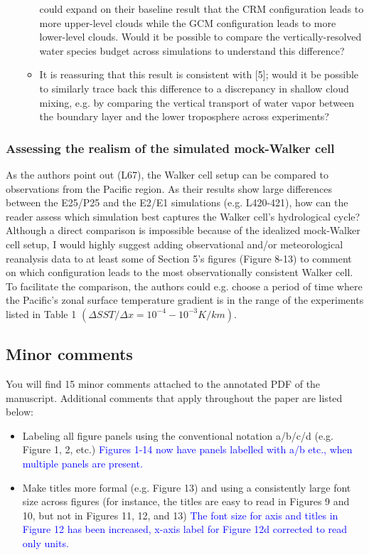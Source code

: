 \documentclass[draft]{agujournal2019}
\begin{document}
\begin{enumerate}
\begin{itemize}
could expand on their baseline result that the CRM configuration leads to more upper-level clouds while the GCM
configuration leads to more lower-level clouds. Would it be possible to compare the vertically-resolved water species
budget across simulations to understand this difference?
      \item It is reassuring that this result is consistent with [5]; would it be possible to similarly trace back this difference to a
discrepancy in shallow cloud mixing, e.g. by comparing the vertical transport of water vapor between the boundary
layer and the lower troposphere across experiments?
    \end{itemize}
\end{enumerate}

\subsubsection{Assessing the realism of the simulated mock-Walker cell}

As the authors point out (L67), the Walker cell setup can be compared to observations from the Pacific region. As their
results show large differences between the E25/P25 and the E2/E1 simulations (e.g. L420-421), how can the reader
assess which simulation best captures the Walker cell’s hydrological cycle?
Although a direct comparison is impossible because of the idealized mock-Walker cell setup, I would highly suggest
adding observational and/or meteorological reanalysis data to at least some of Section 5’s figures (Figure 8-13) to comment
on which configuration leads to the most observationally consistent Walker cell. To facilitate the comparison, the authors
could e.g. choose a period of time where the Pacific’s zonal surface temperature gradient is in the range of the experiments
listed in Table 1 $(\Delta SST/ \Delta x = 10^{-4} - 10^{-3} K/km).  $

\subsection{Minor comments}

You will find 15 minor comments attached to the annotated PDF of the manuscript. Additional comments that apply
throughout the paper are listed below:
\begin{itemize}
  \item Labeling all figure panels using the conventional notation a/b/c/d (e.g. Figure 1, 2, etc.)
  \textcolor{blue}{Figures 1-14 now have panels labelled with a/b etc., when multiple panels are present.}
  
  \item Make titles more formal (e.g. Figure 13) and using a consistently large font size across figures (for instance, the
titles are easy to read in Figures 9 and 10, but not in Figures 11, 12, and 13)
  \textcolor{blue}{The font size for axis and titles in Figure 12 has been increased, x-axis label for Figure 12d corrected to read only units.}
\end{itemize}









\end{document}
